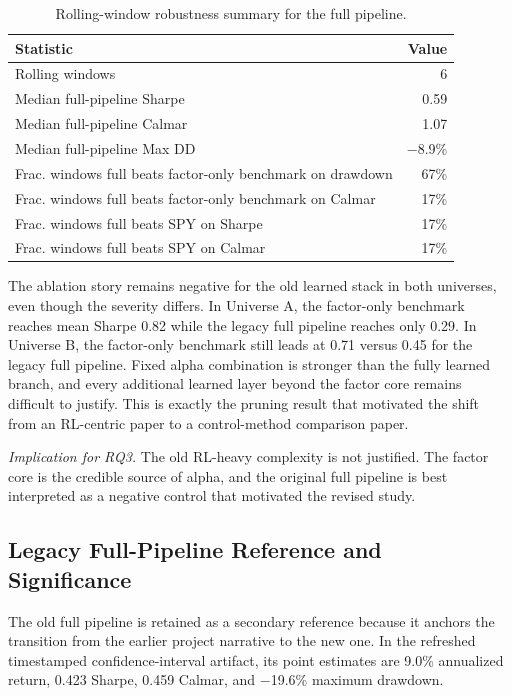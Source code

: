 \documentclass[10pt,twocolumn]{article}
\begin{document}
\begin{table}[t]
\centering
\caption{Rolling-window robustness summary for the full pipeline.}
\label{tab:robustness_summary}
\begingroup\small
\begin{tabular}{@{} >{\raggedright\arraybackslash}p{} r @{}}
\toprule
\textbf{Statistic} & \textbf{Value} \\
\midrule
Rolling windows                                    & 6 \\
Median full-pipeline Sharpe                        & 0.59 \\
Median full-pipeline Calmar                        & 1.07 \\
Median full-pipeline Max DD                        & $-$8.9\% \\
Frac. windows full beats factor-only benchmark on drawdown & 67\% \\
Frac. windows full beats factor-only benchmark on Calmar   & 17\% \\
Frac. windows full beats SPY on Sharpe             & 17\% \\
Frac. windows full beats SPY on Calmar             & 17\% \\
\bottomrule
\end{tabular}
\endgroup
\end{table}

The ablation story remains negative for the old learned stack in both
universes, even though the severity differs. In Universe A, the factor-only
benchmark reaches mean Sharpe 0.82 while the legacy full pipeline reaches only
0.29. In Universe B, the factor-only benchmark still leads at 0.71 versus 0.45
for the legacy full pipeline. Fixed alpha combination is stronger than the
fully learned branch, and every additional learned layer beyond the factor core
remains difficult to justify. This is exactly the pruning result that motivated
the shift from an RL-centric paper to a control-method comparison paper.

\noindent\textit{Implication for RQ3.} The old RL-heavy complexity is not
justified. The factor core is the credible source of alpha, and the original
full pipeline is best interpreted as a negative control that motivated the
revised study.

\subsection{Legacy Full-Pipeline Reference and Significance}

The old full pipeline is retained as a secondary reference because it anchors
the transition from the earlier project narrative to the new one. In the
refreshed timestamped confidence-interval artifact, its point estimates are
9.0\% annualized return, 0.423 Sharpe, 0.459 Calmar, and $-$19.6\% maximum
drawdown.
\end{document}
